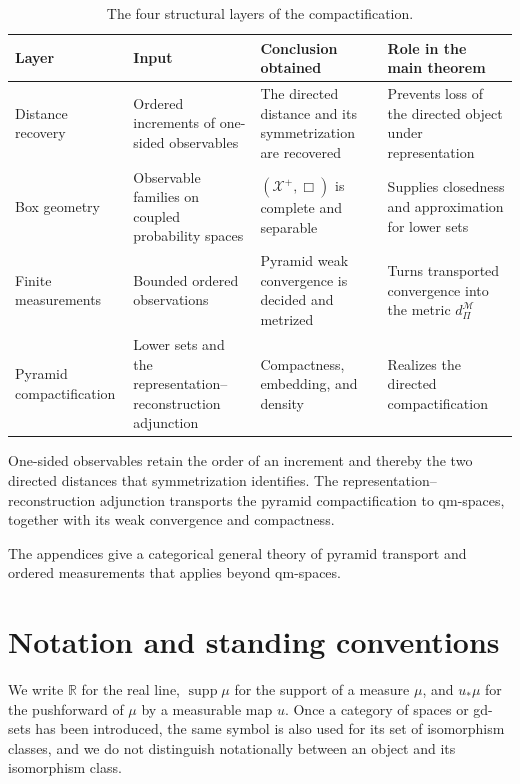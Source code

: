 \documentclass{amsart}
\theoremstyle{plain}
\theoremstyle{definition}
\theoremstyle{remark}
\newcommand{\R}{\mathbb{R}}
\newcommand{\Xp}{\mathcal{X}^{+}}
\newcommand{\M}{\mathcal{M}}
\DeclareMathOperator{\supp}{supp}
\begin{document}
\begin{table}[t]
\centering
\small
\setlength{\tabcolsep}{3pt}
\renewcommand{\arraystretch}{1.15}
\begin{tabular}{>{\raggedright\arraybackslash}p{}>{\raggedright\arraybackslash}p{}>{\raggedright\arraybackslash}p{}>{\raggedright\arraybackslash}p{}}
\hline
Layer & Input & Conclusion obtained & Role in the main theorem\\
\hline
Distance recovery & Ordered increments of one-sided observables & The directed distance and its symmetrization are recovered & Prevents loss of the directed object under representation\\
Box geometry & Observable families on coupled probability spaces & $(\Xp,\Box)$ is complete and separable & Supplies closedness and approximation for lower sets\\
Finite measurements & Bounded ordered observations & Pyramid weak convergence is decided and metrized & Turns transported convergence into the metric $d_{\Pi}^{\M}$\\
Pyramid compactification & Lower sets and the representation--reconstruction adjunction & Compactness, embedding, and density & Realizes the directed compactification\\
\hline
\end{tabular}
\caption{The four structural layers of the compactification.}
\label{tab:introduction-overview}
\end{table}

One-sided observables retain the order of an increment and thereby the two directed distances that symmetrization identifies. The representation--reconstruction adjunction transports the pyramid compactification to qm-spaces, together with its weak convergence and compactness.

The appendices give a categorical general theory of pyramid transport and ordered measurements that applies beyond qm-spaces.

\section*{Notation and standing conventions}

We write $\R$ for the real line, $\supp\mu$ for the support of a measure $\mu$, and $u_*\mu$ for the pushforward of $\mu$ by a measurable map $u$. Once a category of spaces or gd-sets has been introduced, the same symbol is also used for its set of isomorphism classes, and we do not distinguish notationally between an object and its isomorphism class.
\end{document}
